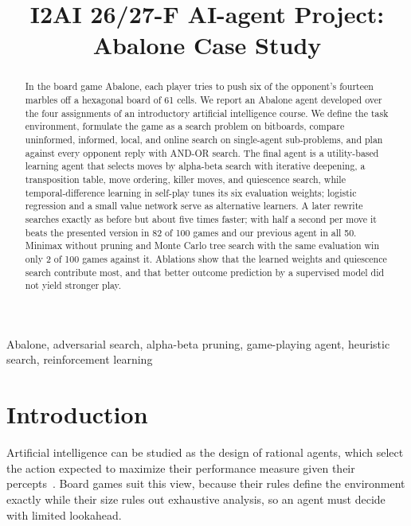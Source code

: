 \documentclass[conference,a4paper]{IEEEtran}
\begin{document}
\title{I2AI 26/27-F AI-agent Project:\\ Abalone Case Study}

\author{
}

\maketitle

\begin{abstract}
In the board game Abalone, each player tries to push six of the opponent's fourteen marbles off a hexagonal board of 61 cells. We report an Abalone agent developed over the four assignments of an introductory artificial intelligence course. We define the task environment, formulate the game as a search problem on bitboards, compare uninformed, informed, local, and online search on single-agent sub-problems, and plan against every opponent reply with AND-OR search. The final agent is a utility-based learning agent that selects moves by alpha-beta search with iterative deepening, a transposition table, move ordering, killer moves, and quiescence search, while temporal-difference learning in self-play tunes its six evaluation weights; logistic regression and a small value network serve as alternative learners. A later rewrite searches exactly as before but about five times faster; with half a second per move it beats the presented version in 82 of 100 games and our previous agent in all 50. Minimax without pruning and Monte Carlo tree search with the same evaluation win only 2 of 100 games against it. Ablations show that the learned weights and quiescence search contribute most, and that better outcome prediction by a supervised model did not yield stronger play.
\end{abstract}

\begin{IEEEkeywords}
Abalone, adversarial search, alpha-beta pruning, game-playing agent, heuristic search, reinforcement learning
\end{IEEEkeywords}

\section{Introduction}
Artificial intelligence can be studied as the design of rational agents, which select the action expected to maximize their performance measure given their percepts~\cite{russell2021}. Board games suit this view, because their rules define the environment exactly while their size rules out exhaustive analysis, so an agent must decide with limited lookahead.
\end{document}
